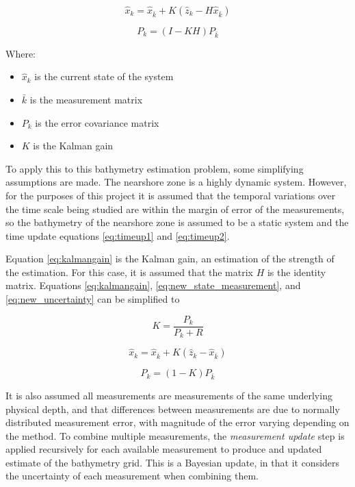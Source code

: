 \begin{equation}\label{eq:new_state_measurement}
    \hat{x}_k = \hat{x}_{\bar{k}} + K(\hat{z}_k - H \hat{x}_{\bar{k}})
\end{equation}

\begin{equation}\label{eq:new_uncertainty}
    P_k = (I - KH)P_{\bar{k}}
\end{equation}

Where:
\begin{itemize}
    \item $\hat{x}_k$ is the current state of the system
    \item $\bar{k}$ is the measurement matrix
    \item $P_k$ is the error covariance matrix
    \item $K$ is the Kalman gain
\end{itemize}

To apply this to this bathymetry estimation problem, some simplifying assumptions are made. The nearshore zone is a highly dynamic system. However, for the purposes of this project it is assumed that the temporal variations over the time scale being studied are within the margin of error of the measurements, so the bathymetry of the nearshore zone is assumed to be a static system and the time update equations \ref{eq:timeup1} and \ref{eq:timeup2}. 

Equation \ref{eq:kalmangain} is the Kalman gain, an estimation of the strength of the estimation. For this case, it is assumed that the matrix $H$ is the identity matrix. Equations \ref{eq:kalmangain}, \ref{eq:new_state_measurement}, and \ref{eq:new_uncertainty} can be simplified to 

$$ K =  \frac{P_k}{P_k + R} $$

$$ \hat{x}_k =  \hat{x}_{\bar{k}} + K(\hat{z}_k -  \hat{x}_{\bar{k}}) $$


$$ P_k = (1 - K) P_{\bar{k}} $$


It is also assumed all measurements are measurements of the same underlying physical depth, and that differences between measurements are due to normally distributed measurement error, with magnitude of the error varying depending on the method. To combine multiple measurements, the \emph{measurement update} step is applied recursively for each available measurement to produce and updated estimate of the bathymetry grid. This is a Bayesian update, in that it considers the uncertainty of each measurement when combining them. 

